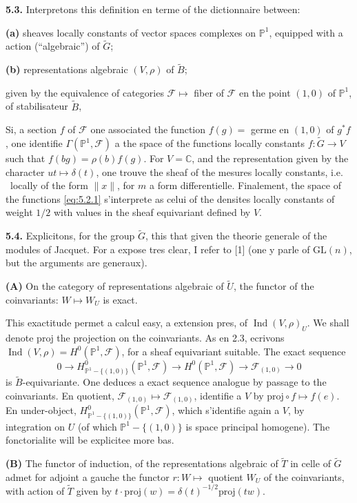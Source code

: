 \documentclass[12pt,a4paper]{article}
\theoremstyle{plain}
\theoremstyle{definition}
\theoremstyle{remark}
\DeclareMathOperator{\Ind}{Ind}
\newcommand{\CC}{\mathbb{C}}
\newcommand{\wt}{\widetilde}
\newcommand{\cF}{\mathscr{F}}
\newcommand{\PP}{\mathbb{P}}
\providecommand{\CC}{\mathbb{C}}
\providecommand{\PP}{\mathbb{P}}
\providecommand{\cF}{\mathcal{F}}
\begin{document}
\textbf{5.3.} Interpretons this definition en terme of the dictionnaire between:

\textbf{(a)} sheaves locally constants of vector spaces complexes on $\PP^1$, equipped with a action (``algebraic'') of $\wt{G}$;

\textbf{(b)} representations algebraic $(V, \rho)$ of $\wt{B}$;

given by the equivalence of categories $\cF \mapsto$ fiber of $\cF$ en the point $(1, 0)$ of $\PP^1$, of stabilisateur $\wt{B}$,

Si, a section $f$ of $\cF$ one associated the function $f(g) =$ germe en $(1, 0)$ of $g^*f$, one identifie $\Gamma(\PP^1, \cF)$ a the space of the functions locally constants $f : \wt{G} \to V$ such that $f(bg) = \rho(b) f(g)$. For $V = \CC$, and the representation given by the character $ut \mapsto \delta(t)$, one trouve the sheaf of the mesures locally constants, i.e.
\ locally of the form $\|x\|$, for $m$ a form differentielle. Finalement, the space of the functions \eqref{eq:5.2.1} s'interprete as celui of the densites locally constants of weight $1/2$ with values in the sheaf equivariant defined by $V$.

\textbf{5.4.} Explicitons, for the group $\wt{G}$, this that given the theorie generale of the modules of Jacquet. For a expose tres clear, I refer to [1] (one y parle of $\mathrm{GL}(n)$, but the arguments are generaux).

\textbf{(A)} On the category of representations algebraic of $\wt{U}$, the functor of the coinvariants: $W \mapsto W_U$ is exact.

This exactitude permet a calcul easy, a extension pres, of $\Ind(V, \rho)_U$. We shall denote $\mathrm{proj}$ the projection on the coinvariants. As en 2.3, ecrivons $\Ind(V, \rho) = H^0(\PP^1, \cF)$, for a sheaf equivariant suitable. The exact sequence
\[
0 \longrightarrow H^0_{\PP^1 - \{(1,0)\}}(\PP^1, \cF) \longrightarrow H^0(\PP^1, \cF) \longrightarrow \cF_{(1,0)} \longrightarrow 0
\]
is $\wt{B}$-equivariante. One deduces a exact sequence analogue by passage to the coinvariants. En quotient, $\cF_{(1,0)} \mapsto \cF_{(1,0)}$, identifie a $V$ by $\mathrm{proj} \circ f \mapsto f(e)$. En under-object, $H^0_{\PP^1 - \{(1,0)\}}(\PP^1, \cF)$, which s'identifie again a $V$, by integration on $U$ (of which $\PP^1 - \{(1,0)\}$ is space principal homogene). The fonctorialite will be explicitee more bas.

\textbf{(B)} The functor of induction, of the representations algebraic of $\wt{T}$ in celle of $\wt{G}$ admet for adjoint a gauche the functor $r : W \mapsto$ quotient $W_U$ of the coinvariants, with action of $\wt{T}$ given by $t \cdot \mathrm{proj}(w) = \delta(t)^{-1/2} \mathrm{proj}(tw)$.
\end{document}
